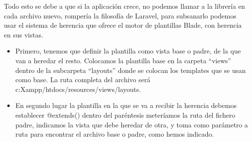 \documentclass{article}
\begin{document}
Todo esto se debe a que si la aplicación crece, no podemos llamar a la librería en cada archivo nuevo, rompería la filosofía de Laravel,  para subsanarlo podemos usar el sistema de herencia que ofrece el motor de plantillas Blade, con herencia en sus vistas.
\begin{itemize}
    \item Primero, tenemos que definir la plantilla como vista base o padre, de la que van a heredar el resto. Colocamos la plantilla base en la carpeta “views” dentro de la subcarpeta “layouts” donde se colocan los templates que se usan como base. La ruta completa del archivo será c:Xampp/htdocs/resources/views/layouts.
    \item En segundo lugar la plantilla en la que se va a recibir la herencia debemos establecer @extends()   dentro del paréntesis meteríamos la ruta del fichero padre, indicamos la vista que debe heredar de otra, y toma como parámetro a ruta para encontrar el archivo base o padre, como hemos indicado.
\end{itemize}
\end{document}
